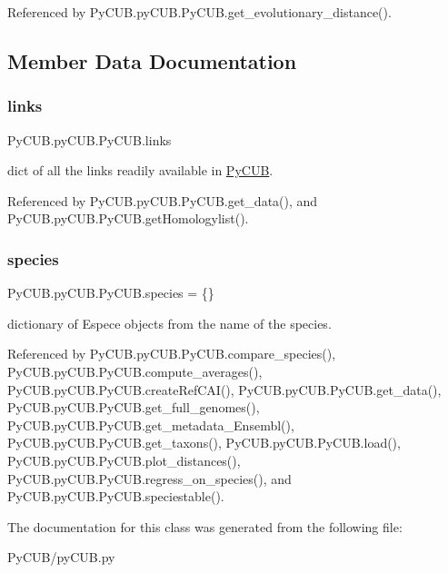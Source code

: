 Referenced by Py\+C\+U\+B.\+py\+C\+U\+B.\+Py\+C\+U\+B.\+get\+\_\+evolutionary\+\_\+distance().



\subsection{Member Data Documentation}
\mbox{\label{class_py_c_u_b_1_1py_c_u_b_1_1_py_c_u_b_a5261b712d010de47f3f3166a97107a32}} 
\subsubsection{\texorpdfstring{links}{links}}
{\footnotesize\ttfamily Py\+C\+U\+B.\+py\+C\+U\+B.\+Py\+C\+U\+B.\+links\hspace{0.3cm}{\ttfamily [static]}}



dict of all the links readily available in \mbox{\hyperlink{class_py_c_u_b_1_1py_c_u_b_1_1_py_c_u_b}{Py\+C\+UB}}. 



Referenced by Py\+C\+U\+B.\+py\+C\+U\+B.\+Py\+C\+U\+B.\+get\+\_\+data(), and Py\+C\+U\+B.\+py\+C\+U\+B.\+Py\+C\+U\+B.\+get\+Homologylist().

\mbox{\label{class_py_c_u_b_1_1py_c_u_b_1_1_py_c_u_b_a60cc232d3d52f88fe8a80244b3fcddc8}} 
\subsubsection{\texorpdfstring{species}{species}}
{\footnotesize\ttfamily Py\+C\+U\+B.\+py\+C\+U\+B.\+Py\+C\+U\+B.\+species = \{\}\hspace{0.3cm}{\ttfamily [static]}}



dictionary of Espece objects from the name of the species. 



Referenced by Py\+C\+U\+B.\+py\+C\+U\+B.\+Py\+C\+U\+B.\+compare\+\_\+species(), Py\+C\+U\+B.\+py\+C\+U\+B.\+Py\+C\+U\+B.\+compute\+\_\+averages(), Py\+C\+U\+B.\+py\+C\+U\+B.\+Py\+C\+U\+B.\+create\+Ref\+C\+A\+I(), Py\+C\+U\+B.\+py\+C\+U\+B.\+Py\+C\+U\+B.\+get\+\_\+data(), Py\+C\+U\+B.\+py\+C\+U\+B.\+Py\+C\+U\+B.\+get\+\_\+full\+\_\+genomes(), Py\+C\+U\+B.\+py\+C\+U\+B.\+Py\+C\+U\+B.\+get\+\_\+metadata\+\_\+\+Ensembl(), Py\+C\+U\+B.\+py\+C\+U\+B.\+Py\+C\+U\+B.\+get\+\_\+taxons(), Py\+C\+U\+B.\+py\+C\+U\+B.\+Py\+C\+U\+B.\+load(), Py\+C\+U\+B.\+py\+C\+U\+B.\+Py\+C\+U\+B.\+plot\+\_\+distances(), Py\+C\+U\+B.\+py\+C\+U\+B.\+Py\+C\+U\+B.\+regress\+\_\+on\+\_\+species(), and Py\+C\+U\+B.\+py\+C\+U\+B.\+Py\+C\+U\+B.\+speciestable().



The documentation for this class was generated from the following file\+:\begin{DoxyCompactItemize}
\item 
Py\+C\+U\+B/py\+C\+U\+B.\+py\end{DoxyCompactItemize}
